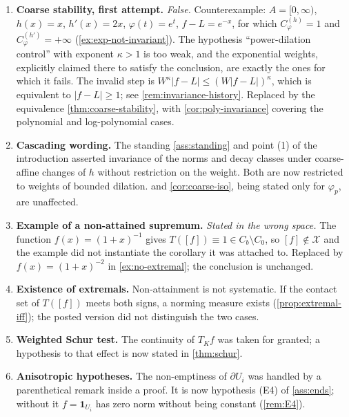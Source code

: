 \documentclass[11pt,a4paper]{article}
\numberwithin{equation}{section}
\theoremstyle{plain}
\theoremstyle{definition}
\theoremstyle{remark}
\newcommand{\Cb}{C_b}
\newcommand{\Cz}{C_0}
\newcommand{\Xdec}{\mathcal{X}}
\begin{document}
\begin{enumerate}

\item \textbf{Coarse stability, first attempt.} \emph{False.} Counterexample:
$A=[0,\infty)$, $h(x)=x$, $h'(x)=2x$, $\varphi(t)=e^{t}$, $f-L=e^{-x}$, for which
$C^{(h)}_\varphi=1$ and $C^{(h')}_\varphi=+\infty$ (\cref{ex:exp-not-invariant}). The
hypothesis ``power-dilation control'' with exponent $\kappa>1$ is too weak, and the
exponential weights, explicitly claimed there to satisfy the conclusion, are exactly the
ones for which it fails. The invalid step is
$W^{\kappa}|f-L|\le(W|f-L|)^{\kappa}$, which is equivalent to $|f-L|\ge1$; see
\cref{rem:invariance-history}. Replaced by the equivalence \cref{thm:coarse-stability}, with
\cref{cor:poly-invariance} covering the polynomial and log-polynomial cases.

\item \textbf{Cascading wording.} The standing \cref{ass:standing} and point (1) of the
introduction asserted invariance of the norms and decay classes under coarse-affine
changes of $h$ without restriction on the weight. Both are now restricted to weights of
bounded dilation.  and \cref{cor:coarse-iso}, being stated only for
$\varphi_p$, are unaffected.

\item \textbf{Example of a non-attained supremum.} \emph{Stated in the wrong space.} The function $f(x)=(1+x)^{-1}$ gives $T([f])\equiv1\in\Cb\setminus\Cz$, so
$[f]\notin\Xdec$ and the example did not instantiate the corollary it was attached to.
Replaced by $f(x)=(1+x)^{-2}$ in \cref{ex:no-extremal}; the conclusion is unchanged.

\item \textbf{Existence of extremals.} Non-attainment is not systematic. If the contact
set of $T([f])$ meets both signs, a norming measure exists
(\cref{prop:extremal-iff}); the posted version did not distinguish the two cases.

\item \textbf{Weighted Schur test.} The continuity of $T_Kf$ was taken
for granted; a hypothesis to that effect is now stated in \cref{thm:schur}.

\item \textbf{Anisotropic hypotheses.} The
non-emptiness of $\partial U_i$ was handled by a parenthetical remark inside a proof. It is
now hypothesis (E4) of \cref{ass:ends}; without it $f=\mathbf{1}_{U_i}$ has zero norm
without being constant (\cref{rem:E4}).


\end{enumerate}
\end{document}
